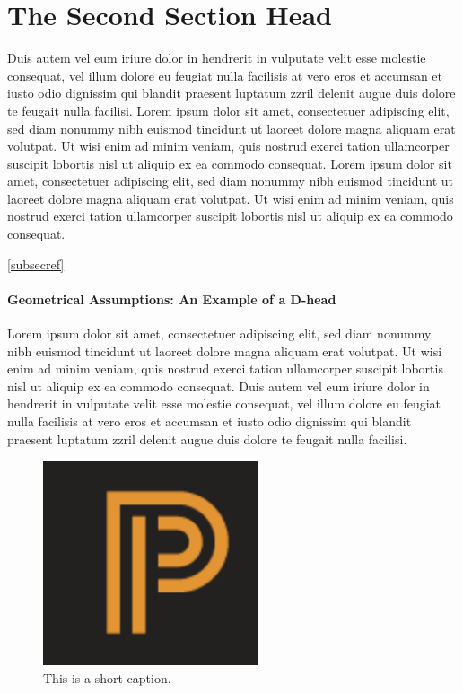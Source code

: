 \documentclass[oldfontcommands,6x9]{pupbook}
\begin{document}
\section{The Second Section Head}
Duis autem vel eum iriure dolor in hendrerit in vulputate velit esse
molestie consequat, vel illum dolore eu feugiat nulla facilisis at vero
eros et accumsan et iusto odio dignissim qui blandit praesent luptatum
zzril delenit augue duis dolore te feugait nulla facilisi. Lorem ipsum
dolor sit amet, consectetuer adipiscing elit, sed diam nonummy nibh
euismod tincidunt ut laoreet dolore magna aliquam erat volutpat. Ut wisi
enim ad minim veniam, quis nostrud exerci tation ullamcorper suscipit
lobortis nisl ut aliquip ex ea commodo consequat. Lorem ipsum
dolor sit amet, consectetuer adipiscing elit, sed diam nonummy nibh
euismod tincidunt ut laoreet dolore magna aliquam erat volutpat. Ut wisi
enim ad minim veniam, quis nostrud exerci tation ullamcorper suscipit
lobortis nisl ut aliquip ex ea commodo consequat. 

\ref{subsecref}

\paragraph{Geometrical Assumptions: An Example of a D-head}
Lorem ipsum dolor sit amet, consectetuer adipiscing elit, sed diam
nonummy nibh euismod tincidunt ut laoreet dolore magna aliquam erat
volutpat. Ut wisi enim ad minim veniam, quis nostrud exerci tation
ullamcorper suscipit lobortis nisl ut aliquip ex ea commodo consequat.
Duis autem vel eum iriure dolor in hendrerit in vulputate velit esse
molestie consequat, vel illum dolore eu feugiat nulla facilisis at vero
eros et accumsan et iusto odio dignissim qui blandit praesent luptatum
zzril delenit augue duis dolore te feugait nulla facilisi. 

\begin{figure}
\centerline{\includegraphics[width=2.5in]{PUPLogo}}
\caption{This is a short caption.}
\end{figure}
\end{document}
